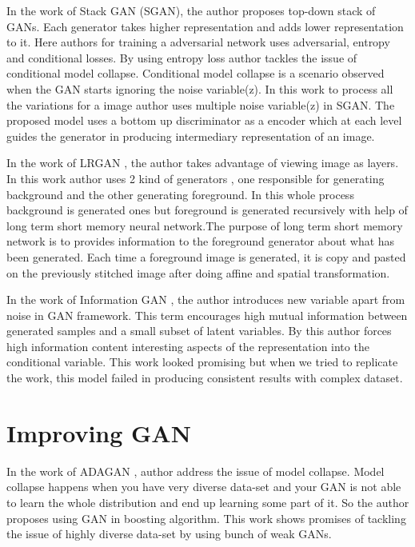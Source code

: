 In the work of Stack GAN (SGAN)\cite{stacked-gan}, the author proposes top-down stack of GANs. Each generator takes higher representation and adds lower representation to it. Here authors for training  a adversarial network uses adversarial, entropy and conditional losses. By using entropy loss author tackles the issue of conditional model collapse. Conditional model collapse  is a  scenario	observed	when	the	GAN	starts	ignoring the noise variable(z). In this work to process all the variations for a image author uses multiple noise variable(z) in SGAN. The proposed model uses a bottom up discriminator as a encoder which at each level guides the generator in producing intermediary representation of an image.

In the work of LRGAN \cite{LR-GAN}, the author takes advantage of viewing image as layers. In this work author uses 2 kind of generators , one responsible for generating background and the other generating foreground. In this whole process background is generated ones but foreground is generated recursively with help of long term short memory neural network\cite{hochreiter1997long}.The purpose of long term short memory network is to  provides information to the foreground generator about what has been generated. Each time a foreground image is generated, it is copy and pasted on the previously stitched image after doing affine and spatial transformation\cite{1506.02025}. 



In the work of Information GAN \cite{infogan}, the author introduces new variable apart from noise in GAN framework. This term encourages high mutual information between generated samples and a small subset of latent variables. By this author forces high information content interesting aspects of the representation into the conditional variable. This work looked promising but when we tried to replicate the work, this model failed in producing consistent results with complex dataset.


\section{Improving GAN}

In the work of ADAGAN \cite{ADAGAN}, author address the issue of model collapse. Model collapse happens when you have very diverse data-set and your GAN is not able to learn the whole distribution and end up learning some part of it. So the author proposes using GAN in boosting algorithm. This work shows promises of tackling the issue of highly diverse data-set by using bunch of weak GANs.
\par


